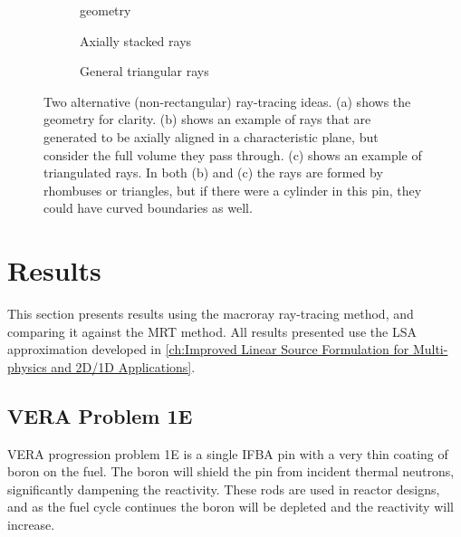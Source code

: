 {{{{        \begin{figure}[h]
          \centering
          \begin{subfigure}[t]{0.32\textwidth}
            \centering
            \def\svgwidth{0.85\linewidth}
            
            \caption{geometry\label{fig:MR:Alternatives:Geom}}
          \end{subfigure}%
          \begin{subfigure}[t]{0.32\textwidth}
            \centering
            \def\svgwidth{0.85\linewidth}
            
            \caption{Axially stacked rays\label{fig:MR:Alternative 1}}
          \end{subfigure}%
          \begin{subfigure}[t]{0.32\textwidth}
            \centering
            \def\svgwidth{0.85\linewidth}
            
            \caption{General triangular rays\label{fig:MR:Alternative 2}}
          \end{subfigure}
          \caption{
            Two alternative (non-rectangular) ray-tracing ideas.
            (a) shows the geometry for clarity.
            (b) shows an example of rays that are generated to be axially aligned in a characteristic plane, but consider the full volume they pass through.
            (c) shows an example of triangulated rays.
            In both (b) and (c) the rays are formed by rhombuses or triangles, but if there were a cylinder in this pin, they could have curved boundaries as well.
          }
          \label{figs:MR:Alternatives}
        \end{figure}
      }
    }
  }

  \section{Results}{\label{sec:MR:Results}
    This section presents results using the macroray ray-tracing method, and comparing it against the \acf{MRT} method.
    All results presented use the \ac{LSA} approximation developed in \cref{ch:Improved Linear Source Formulation for Multi-physics and 2D/1D Applications}.

    \subsection{VERA Problem 1E}{\label{ssec:MR:VERA Problem 1E}
      \ac{VERA} progression problem 1E \cite{VERAProblems} is a single \ac{IFBA} pin with a very thin coating of boron on the fuel.
      The boron will shield the pin from incident thermal neutrons, significantly dampening the reactivity.
      These rods are used in reactor designs, and as the fuel cycle continues the boron will be depleted and the reactivity will increase.

}}}
